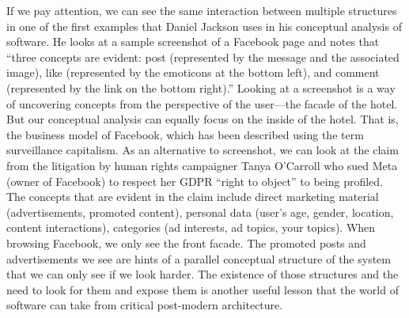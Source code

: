 If we pay attention, we can see the same interaction between multiple structures in
one of the first examples that Daniel Jackson uses in his conceptual analysis of software.
He looks at a sample screenshot of a Facebook page and notes that ``three concepts are evident:
post (represented by the message and the associated image), like (represented by the emoticons
at the bottom left), and comment (represented by the link on the bottom right).''
Looking at a screenshot is a way of uncovering concepts from the perspective of the user---the
facade of the hotel. But our conceptual analysis can equally focus on the inside of the
hotel. That is, the business model of Facebook, which has been described using the term
surveillance capitalism. As an alternative to screenshot, we can look at the claim
from the litigation by human rights campaigner Tanya O'Carroll who sued Meta (owner of Facebook)
to respect her GDPR ``right to object'' to being profiled.
The concepts that are evident in the claim include direct marketing material (advertisements,
promoted content), personal data (user's age, gender, location, content interactions),
categories (ad interests, ad topics, your topics). When browsing Facebook, we only see the front
facade. The promoted posts and advertisements we see are hints of a parallel conceptual
structure of the system that we can only see if we look harder. The existence of those structures
and the need to look for them and expose them is another useful lesson that the world of software
can take from critical post-modern architecture.


